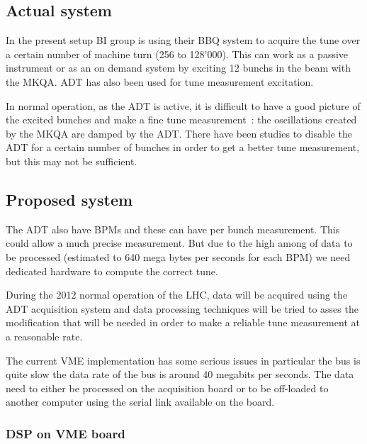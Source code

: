 \documentclass[a4paper]{article}
\begin{document}
\subsection{Actual system}

In the present setup \gls{BI} group is using their \gls{BBQ} 
\cite{Boccardi:1156349} system to acquire the tune over a certain number
of machine turn (256 to 128'000). This can work as a passive instrument or as 
an on demand system by exciting 12 \glspl{bunch} in the beam with the 
\gls{MKQA}. \Gls{ADT} has also been used for tune measurement 
excitation\cite{HofleEvian10}. 

In normal operation, as the \gls{ADT} is active, it is difficult to have a
good picture of the excited bunches and make a fine tune measurement~: the
oscillations created by the \gls{MKQA} are damped by the \gls{ADT}. There
have been studies to disable the \gls{ADT} for a certain number of bunches in
order to get a better tune measurement\cite{HofleEvian11}, but this may
not be sufficient.

\subsection{Proposed system}

The \gls{ADT} also have \glspl{BPM} and these can have per bunch 
measurement\cite{BphMeas07}. This could allow a much precise measurement. But due 
to the high among of data to be processed (estimated to 640 mega bytes per 
seconds for each \gls{BPM}) we need dedicated hardware to compute the 
correct tune\cite{HofleChamonix12}.

During the 2012 normal operation of the \gls{LHC}, data will be acquired using
the \gls{ADT} acquisition system and data processing techniques will be 
tried to asses the modification that will be needed in order to make a 
reliable \gls{tune} measurement at a reasonable rate\cite{HofleChamonix12}.

The current \gls{VME} implementation has some serious issues in particular 
the bus is quite slow the data rate of the bus is around 40 megabits per 
seconds. The data need to either be processed on the acquisition board or 
to be off-loaded to another computer using the serial link available on the 
board\cite{Baudrenghien:1124094}.

\subsubsection{DSP on VME board}
\end{document}
